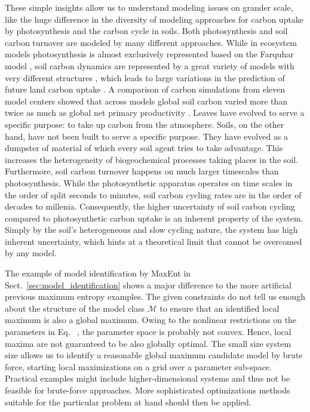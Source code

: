 \documentclass[smallextended]{svjour3}
\makeatletter
\renewcommand*{\eqref}[1]{%
  \hyperref[{#1}]{\textup{\tagform@{\ref*{#1}}}}%
}
\makeatother
\begin{document}
These simple insights allow us to understand modeling issues on grander scale, like the huge difference in the diversity of modeling approaches for carbon uptake by photosynthesis and the carbon cycle in soils.
Both photosynthesis \citep{garcia2022mathematical} and soil carbon turnover \citep{manzoni2009soil} are modeled by many different approaches.
While in ecosystem models photosynthesis is almost exclusively represented based \citep{zaehle2014evaluation} on the Farquhar model \citep{farquhar1980biochemical}, soil carbon dynamics are represented by a great variety of models with very different structures \citep{friedlingstein2006climate}, which leads to large variations in  the prediction of future land carbon uptake \citep{friedlingstein2006climate,friedlingstein2014uncertainties}.
A comparison of carbon simulations from eleven model centers showed that across models global soil carbon varied more than twice as much as global net primary productivity \citep{todd2013causes}.
Leaves have evolved to serve a specific purpose: to take up carbon from the atmosphere.
Soils, on the other hand, have not been built to serve a specific purpose.
They have evolved as a dumpster of material of which every soil agent tries to take advantage.
This increases the heterogeneity of biogeochemical processes taking places in the soil.
Furthermore, soil carbon turnover happens on much larger timescales than photosynthesis.
While the photosynthetic apparatus operates on time scales in the order of split seconds to minutes, soil carbon cycling rates are in the order of decades to millenia.
Consequently, the higher uncertainty of soil carbon cycling compared to photosynthetic carbon uptake is an inherent property of the system.
Simply by the soil's heterogeneous and slow cycling nature, the system has high inherent uncertainty, which hints at a theoretical limit that cannot be overcomed by any model.

The example of model identification by MaxEnt in Sect.~\ref{sec:model_identification} shows a major difference to the more artificial previous maximum entropy examples.
The given constraints do not tell us enough about the structure of the model class $\mathcal{M}$ to ensure that an identified local maximum is also a global maximum.
Owing to the nonlinear restrictions on the parameters in Eq.~\eqref{eqn:measurement_data}, the parameter space is probably not convex.
Hence, local maxima are not guaranteed to be also globally optimal.
The small size system size allows us to identify a reasonable global maximum candidate model by brute force, starting local maximizations on a grid over a parameter sub-space.
Practical examples might include higher-dimensional systems and thus not be feasible for brute-force approaches.
More sophisticated optimizations methods suitable for the particular problem at hand should then be applied.
\end{document}
